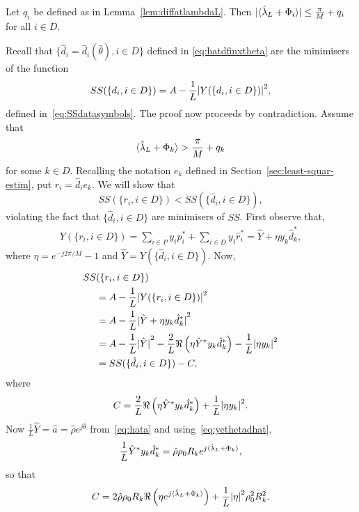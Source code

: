\documentclass[journal]{IEEEtran}
\begin{document}
\begin{lemma}\label{lem:fracpartlambdahatnotpi} Let $q_i$ be defined as in Lemma~\ref{lem:diffatlambdaL}.  Then ${\vert \langle \hat{\lambda}_L + \Phi_i \rangle \vert} \leq \frac{\pi}{M} + q_i$ for all $i \in D$.
\end{lemma}
\begin{IEEEproof}
Recall that $\{\hat{d}_i = \hat{d}_i(\hat{\theta}), i \in D\}$ defined in \eqref{eq:hatdfinxtheta} are the minimisers of the function 
\[
SS(\{d_i, i \in D\}) = A - \frac{1}{L}{\vert Y(\{d_i, i \in D\}) \vert}^2,
\]
defined in~\eqref{eq:SSdatasymbols}. The proof now proceeds by contradiction.  Assume that 
\begin{equation}\label{eq:fraclambassumption}
\langle \hat{\lambda}_L + \Phi_k \rangle > \frac{\pi}{M} + q_k
\end{equation}
for some $k \in D$.  Recalling the notation $e_k$ defined in Section~\ref{sec:least-squar-estim}, put $r_i = \hat{d}_i e_k$.  We will show that 
\[
SS(\{r_i, i \in D\}) < SS(\{\hat{d}_i, i \in D\}),
\]
violating the fact that $\{\hat{d}_i, i \in D\}$ are minimisers of $SS$.  First observe that,
\begin{align*}
Y(\{ r_i, i \in D\}) = \sum_{i \in P} y_ip_i^* + \sum_{i \in D} y_i\hat{r}_i^* = \hat{Y} + \eta y_k\hat{d}_k^*,
\end{align*}
where $\eta = e^{-j2\pi/M} - 1$ and $\hat{Y} = Y(\{ \hat{d}_i, i \in D\})$.  Now,
\begin{align*}
SS&(\{r_i, i \in D\}) \\
&= A - \frac{1}{L} {\vert  Y(\{ r_i, i \in D\})  \vert}^2 \\
&= A - \frac{1}{L} {\vert  \hat{Y} + \eta y_k\hat{d}_k^*  \vert}^2 \\
&= A - \frac{1}{L}{\vert \hat{Y} \vert}^2 - \frac{2}{L}\Re\left(\eta \hat{Y}^* y_k \hat{d}_k^* \right) -  \frac{1}{L}{\vert  \eta y_k \vert}^2\\
&= SS(\{\hat{d}_i, i \in D\}) - C,
\end{align*}
where 
\[
C = \frac{2}{L}\Re\left(\eta \hat{Y}^* y_k \hat{d}_k^* \right) +  \frac{1}{L}{\vert  \eta y_k  \vert}^2.
\]
Now $\frac{1}{L}\hat{Y} = \hat{a} = \hat{\rho} e^{j\hat{\theta}}$ from~\eqref{eq:hata} and using~\eqref{eq:yethetadhat},
\[
\frac{1}{L} \hat{Y}^* y_k \hat{d}_k^* = \hat{\rho} \rho_0 R_k e^{j\langle \hat{\lambda}_L + \Phi_k \rangle},
\]
so that
\begin{equation}\label{eq:Ddefn}
C = 2 \hat{\rho} \rho_0 R_k \Re\left( \eta e^{j\langle \hat{\lambda}_L + \Phi_k \rangle}\right) + \frac{1}{L}{\vert \eta \vert}^2\rho_0^2 R_k^2.
\end{equation}

\end{IEEEproof}
\end{document}
